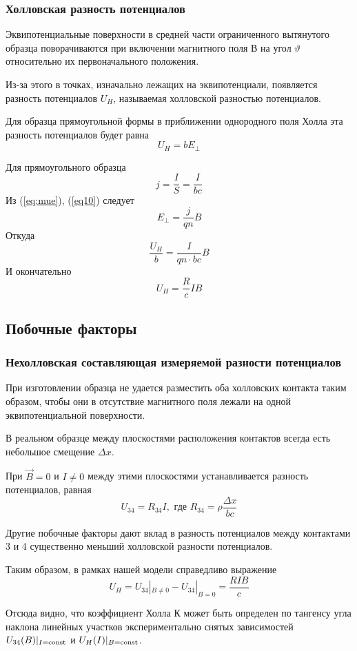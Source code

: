 \subsubsection{Холловская разность потенциалов}

Эквипотенциальные поверхности в средней части ограниченного вытянутого образца поворачиваются при включении магнитного поля В на угол $\vartheta$ относительно их первоначального положения.

Из-за этого в точках, изначально лежащих на эквипотенциали, появляется разность потенциалов $U_H$, называемая холловской разностью потенциалов.

Для образца прямоугольной формы в приближении однородного поля Холла эта разность потенциалов будет равна 
\begin{equation}
	U_H=bE_\perp
\end{equation}

Для прямоугольного образца
\begin{equation}
	j=\frac{I}{S}=\frac{I}{bc}
\end{equation}
Из (\ref{eq:mue}), (\ref{eq10}) следует
\begin{equation}
	{E}_\perp=\frac{j}{qn}B
\end{equation}
Откуда
\begin{equation}
	\frac{U_H}{b}=\frac{I}{qn\cdot bc}B
\end{equation}
И окончательно
\begin{equation}
	U_H=\frac{R}{c}IB
\end{equation}

\subsection{Побочные факторы}
\subsubsection{Нехолловская составляющая измеряемой разности потенциалов}

При изготовлении образца не удается разместить оба холловских контакта таким образом, чтобы они в отсутствие магнитного поля лежали на одной эквипотенциальной поверхности. 

В реальном образце между плоскостями расположения контактов всегда есть небольшое смещение $\Delta x$. 

При $\vec{B}=0$ и $I\ne0$ между этими плоскостями устанавливается разность потенциалов, равная 
\begin{equation}
	U_{34}=R_{34}I,
	\text{  где  }
	R_{34}=\rho\frac{\Delta x}{bc}
\end{equation}

Другие побочные факторы дают вклад в разность потенциалов между контактами 3 и 4 существенно меньший холловской разности потенциалов. 

Таким образом, в рамках нашей модели справедливо выражение
\begin{equation}
	U_H=U_{34}|_{B\ne 0}-U_{34}|_{B= 0}=\frac{RIB}{c}
\end{equation}

Отсюда видно, что коэффициент Холла $К$ может быть определен по тангенсу угла наклона линейных участков экспериментально снятых зависимостей $U_{34}(B)|_{I=\text{\rmfamily\upshape const}}$ и $U_H(I)|_{B=\text{\rmfamily\upshape const}}$.
